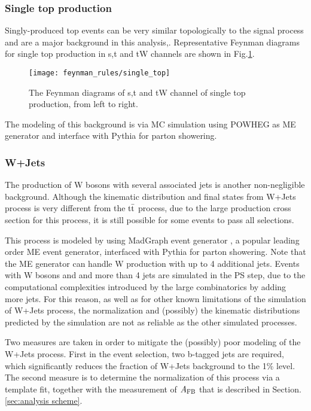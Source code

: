 \subsubsection*{Single top production}
Singly-produced top events can be very similar topologically to the signal process and are a major background in this analysis,. Representative Feynman diagrams for single top production in s,t and tW channels are shown in Fig.\ref{fig:singletop}.

\begin{figure}
	\centering
	\texttt{[image: feynman\_rules/single\_top]}
	\caption[Single top production feynman diagrams]{The Feynman diagrams of s,t and tW channel of single top production, from left to right.\cite{Lannon:2012fp}}
	\label{fig:singletop}
\end{figure}

The modeling of this background is via MC simulation using POWHEG as ME generator and interface with Pythia for parton showering. 

\subsubsection*{W+Jets}

The production of W bosons with several associated jets is another non-negligible background. Although the kinematic distribution and final states from W+Jets process is very different from the $\mathrm{t}\bar{\mathrm{t}}$ process, due to the large production cross section for this process, it is still possible for some events to pass all selections.

This process is modeled by using MadGraph event generator \cite{madgraph5}, a popular leading order ME event generator, interfaced with Pythia for parton showering. Note that the ME generator can handle W production with up to 4 additional jets.  Events with W bosons and and more than 4 jets are simulated in the PS step, due to the computational complexities introduced by the large combinatorics by adding more jets. For this reason, as well as for other known limitations of the simulation of W+Jets process, the normalization and (possibly) the kinematic distributions predicted by the simulation are not as reliable as the other simulated processes.   

Two measures are taken in order to mitigate the (possibly) poor modeling of the W+Jets process. First in the event selection, two b-tagged jets are required, which significantly reduces the fraction of W+Jets background to the 1\% level. The second measure is to determine the normalization of this process via a template fit, together with the measurement of $A_{\mathrm{FB}}$ that is described in Section.\ref{sec:analysis scheme}.

